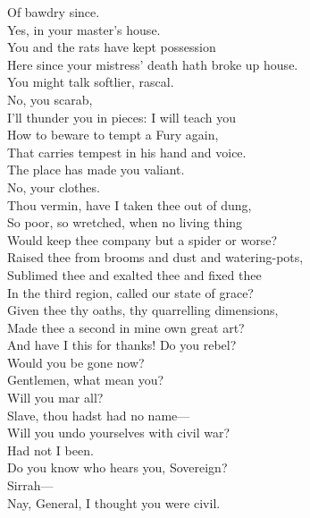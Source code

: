 \documentclass[a4paper,oneside,12pt]{memoir}
\begin{document}
\begin{drama*}
Of bawdry since.\\
\subtlespeaks {} Yes, in your master's house.\\
You and the rats have kept possession\\
Here since your mistress' death hath broke up house.\\
\facespeaks You might talk softlier, rascal.\\
\subtlespeaks {} No, you scarab,\\
I'll thunder you in pieces: I will teach you\\
How to beware to tempt a Fury again,\\
That carries tempest in his hand and voice.\\
\facespeaks The place has made you valiant.\\
\subtlespeaks {} No, your clothes.\\
Thou vermin, have I taken thee out of dung,\\
So poor, so wretched, when no living thing\\
Would keep thee company but a spider or worse?\\
Raised thee from brooms and dust and watering-pots,\\
Sublimed thee and exalted thee and fixed thee\\
In the third region, called our state of grace?\\
Given thee thy oaths, thy quarrelling dimensions,\\
Made thee a second in mine own great art?\\
And have I this for thanks! Do you rebel?\\
Would you be gone now?\\
\dolspeaks {} Gentlemen, what mean you?\\
Will you mar all?\\
\subtlespeaks {} Slave, thou hadst had no name---\\
\dolspeaks Will you undo yourselves with civil war?\\
\subtlespeaks Had not I been.\\
\dolspeaks {} Do you know who hears you, Sovereign?\\
\facespeaks Sirrah---\\
\dolspeaks {} Nay, General, I thought you were civil.\\

\end{drama*}
\end{document}
